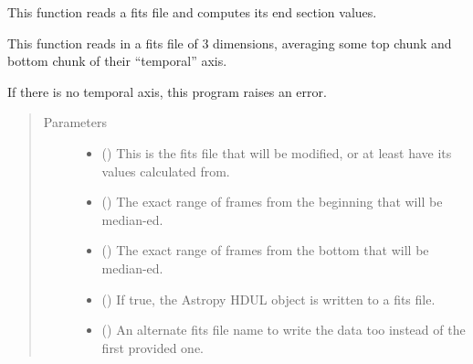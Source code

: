\documentclass[letterpaper,10pt,english]{sphinxmanual}
\begin{document}
\begin{fulllineitems}
\label{\detokenize{python_docstrings/IfA_Smeargle.bravo.averaging:IfA_Smeargle.bravo.averaging.average_endpoints}}
This function reads a fits file and computes its end section values.

This function reads in a fits file of 3 dimensions, averaging some
top chunk and bottom chunk of their “temporal” axis.

If there is no temporal axis, this program raises an error.
\begin{quote}\begin{description}
\item[{Parameters}] \leavevmode\begin{itemize}
\item {} 
 () \textendash{} This is the fits file that will be modified, or at least have its
values calculated from.

\item {} 
 () \textendash{} The exact range of frames from the beginning that will be median-ed.

\item {} 
 () \textendash{} The exact range of frames from the bottom that will be median-ed.

\item {} 
 (\sphinxstyleliteralemphasis{\sphinxupquote{ (}}\sphinxstyleliteralemphasis{\sphinxupquote{)}}) \textendash{} If true, the Astropy HDUL object is written to a fits file.

\item {} 
 (\sphinxstyleliteralemphasis{\sphinxupquote{ (}}\sphinxstyleliteralemphasis{\sphinxupquote{)}}) \textendash{} An alternate fits file name to write the data too instead of the
first provided one.


\end{itemize}
\end{description}
\end{quote}
\end{fulllineitems}
\end{document}
